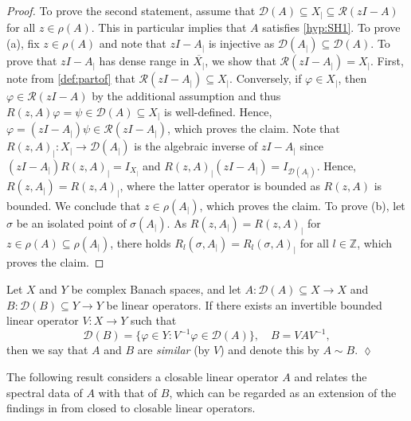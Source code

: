 \documentclass[english]{myarticle}
\begin{document}
\begin{sloppypar}
\begin{proof}
To prove the second statement, assume that $\mathcal{D}(A) \subseteq X_{|} \subseteq \mathcal{R}(zI-A)$ for all $z \in \rho(A)$. This in particular implies that $A$ satisfies \ref{hyp:SH1}. To prove (a), fix $z \in \rho(A)$ and note that $zI - A_{|}$ is injective as $\mathcal{D}(A_{|}) \subseteq \mathcal{D}(A)$. To prove that $zI-A_{|}$ has dense range in $\overline{X_{|}}$, we show that $\mathcal{R}(zI-A_{|}) = X_{|}$. First, note from \cref{def:partof} that $\mathcal{R}(zI - A_{|}) \subseteq X_{|}$. Conversely, if $\varphi \in X_{|}$, then $\varphi \in \mathcal{R}(zI-A)$ by the additional assumption and thus $R(z,A)\varphi = \psi \in \mathcal{D}(A) \subseteq X_{|}$ is well-defined. Hence, $\varphi = (zI-A_{|})\psi \in \mathcal{R}(zI-A_{|})$, which proves the claim. Note that $R(z,A)_{|} : X_{|} \to \mathcal{D}(A_{|})$ is the algebraic inverse of $zI - A_{|}$ since $(zI-A_{|})R(z,A)_{|} = I_{X_{|}}$ and $R(z,A)_{|} (zI-A_{|}) = I_{\mathcal{D}(A_{|})}$. Hence, $R(z,A_{|}) = R(z,A)_{|}$, where the latter operator is bounded as $R(z,A)$ is bounded. We conclude that $z \in \rho(A_{|})$, which proves the claim. To prove (b), let $\sigma$ be an isolated point of $\sigma(A_{|})$. As $R(z,A_{|}) = R(z,A)_{|}$ for $z \in \rho(A) \subseteq \rho(A_{|})$, there holds $R_l(\sigma,A_{|}) = R_l(\sigma,A)_{|}$ for all $l \in \mathbb{Z}$, which proves the claim.
\end{proof}

\begin{definition} \label{def:similar}
Let $X$ and $Y$ be complex Banach spaces, and let $A: \mathcal{D}(A) \subseteq X \to X$ and  $B: \mathcal{D}(B) \subseteq Y \to Y$ be linear operators. If there exists an invertible bounded linear operator $V: X \to Y$ such that 
\begin{equation*}
    \mathcal{D}(B) = \{ \varphi \in Y :  V^{-1}\varphi \in \mathcal{D}(A) \}, \quad B = VAV^{-1},
\end{equation*}
then we say that $A$ and $B$ are \emph{similar} (by $V$) and denote this by $A \sim B$. \hfill $\lozenge$
\end{definition}

The following result considers a closable linear operator $A$ and relates the spectral data of $A$ with that of $B$, which can be regarded as an extension of the findings in \cite[Section II.2.1]{Engel2000} from closed to closable linear operators.


\end{sloppypar}
\end{document}
